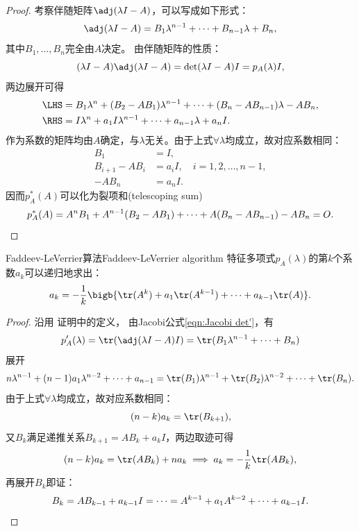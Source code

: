 
\begin{proof}
	考察伴随矩阵$\adj(\lambda I-A)$，可以写成如下形式：
	\[
		\adj(\lambda I-A)=B_1\lambda^{n-1}+\cdots+B_{n-1}\lambda+B_n,
	\]
	其中$B_1,\ldots,B_n$完全由$A$决定。
	由伴随矩阵的性质：
	\[
		(\lambda I-A)\adj(\lambda I-A)=\det(\lambda I-A)I=p_A(\lambda)I,
	\]
	两边展开可得
	\begin{alignat*}{2}
		\LHS&=B_1\lambda^n+(B_2-AB_1)\lambda^{n-1}+\cdots+(B_n-AB_{n-1})\lambda-AB_n,\\
		\RHS&=I\lambda^n+a_1I\lambda^{n-1}+\cdots+a_{n-1}\lambda+a_nI.
	\end{alignat*}
	作为系数的矩阵均由$A$确定，与$\lambda$无关。由于上式$\forall\lambda$均成立，故对应系数相同：
	\begin{align*}
		B_1&=I,\\
		B_{i+1}-AB_i&=a_iI,\quad i=1,2,\ldots,n-1,\\
		-AB_n&=a_nI.
	\end{align*}
	因而$p_A^*(A)$可以化为裂项和(telescoping sum)
	\[
		p_A^*(A)=A^nB_1+A^{n-1}(B_2-AB_1)+\cdots+A(B_n-AB_{n-1})-AB_n=O.
		\qedhere
	\]
\end{proof}

\begin{theorem}
	{Faddeev-LeVerrier算法}{Faddeev-LeVerrier algorithm}
	特征多项式$p_A(\lambda)$的第$k$个系数$a_k$可以递归地求出：
	\begin{equation}
		a_k=-\frac1k\bigb{\tr(A^k)+a_1\tr(A^{k-1})+\cdots+a_{k-1}\tr(A)}.
	\end{equation}
\end{theorem}

\begin{proof}
	沿用 证明中的定义，
	由Jacobi公式\eqref{eqn:Jacobi det'}，有 
	\[
		p_A'(\lambda)=\tr(\adj(\lambda I-A)I)=\tr(B_1\lambda^{n-1}+\cdots+B_n)
	\]
	展开
	\[
		n\lambda^{n-1}+(n-1)a_1\lambda^{n-2}+\cdots+a_{n-1}=\tr(B_1)\lambda^{n-1}+\tr(B_2)\lambda^{n-2}+\cdots+\tr(B_n).
	\]
	由于上式$\forall\lambda$均成立，故对应系数相同：
	\[
		(n-k)a_k=\tr(B_{k+1}),
	\]
	又$B_k$满足递推关系$B_{k+1}=AB_k+a_kI$，两边取迹可得
	\[
		(n-k)a_k=\tr(AB_k)+na_k\implies a_k=-\frac1k\tr(AB_k),
	\]
	再展开$B_k$即证：
	\[
		B_k=AB_{k-1}+a_{k-1}I=\cdots=A^{k-1}+a_1A^{k-2}+\cdots+a_{k-1}I.
		\qedhere
	\]
\end{proof}

